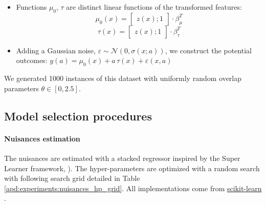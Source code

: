 \documentclass[10pt]{article}
\begin{document}
\begin{itemize}
    \item Functions $\mu_0$, $\tau$ are distinct linear functions of the
          transformed features:
          \begin{equation*}
              \mu_0(x) = \begin{bmatrix} z(x); 1 \end{bmatrix} \cdot \beta_{\mu}^T
          \end{equation*}
          \begin{equation*}
              \tau(x) = \begin{bmatrix} z(x); 1 \end{bmatrix} \cdot \beta_{\tau}^T
          \end{equation*}
    \item Adding a Gaussian noise, $\varepsilon \sim \mathcal N(0, \sigma(x;a))$,
          we construct the potential outcomes:
          $y(a) = \mu_0(x) + a\,\tau(x) + \varepsilon(x, a)$
\end{itemize}
We generated 1000 instances of this dataset with uniformly random overlap
parameters $\theta \in \left[ 0, 2.5 \right]$.

\subsection{Model selection procedures}

\paragraph{Nuisances estimation}\label{apd:experiments:nuisances_hp}

The nuisances are estimated with a stacked regressor inspired by the Super
Learner framework, \cite{laan_super_2007}). The hyper-parameters are
optimized with a random search with following search grid detailed in Table
\ref{apd:experiments:nuisances_hp_grid}. All implementations come from
\href{https://scikit-learn.org/stable/}{scikit-learn}
\cite{pedregosa_scikitlearn_2011}.
\end{document}
